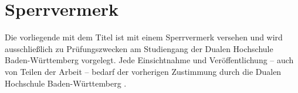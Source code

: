 
\thispagestyle{empty}
\section*{Sperrvermerk}

\vspace*{2em}

Die vorliegende {\arbeitsart} mit dem Titel {\itshape \titel} ist mit einem Sperrvermerk versehen und wird ausschließlich zu Prüfungszwecken am Studiengang {\studiengang} der Dualen Hochschule Baden-Württemberg {\abgabeort} vorgelegt.
Jede Einsichtnahme und Veröffentlichung – auch von Teilen der Arbeit – bedarf der vorherigen Zustimmung durch die Dualen Hochschule Baden-Württemberg \dhbw.
